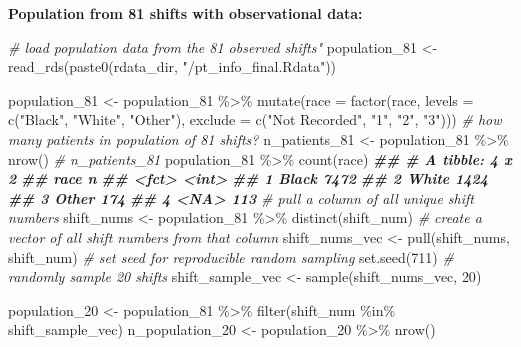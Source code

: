 \documentclass[
]{article}
\newenvironment{Shaded}{\begin{snugshade}}{\end{snugshade}}
\newcommand{\AttributeTok}[1]{\textcolor[rgb]{0.77,0.63,0.00}{#1}}
\newcommand{\CommentTok}[1]{\textcolor[rgb]{0.56,0.35,0.01}{\textit{#1}}}
\newcommand{\DecValTok}[1]{\textcolor[rgb]{0.00,0.00,0.81}{#1}}
\newcommand{\DocumentationTok}[1]{\textcolor[rgb]{0.56,0.35,0.01}{\textbf{\textit{#1}}}}
\newcommand{\FunctionTok}[1]{\textcolor[rgb]{0.00,0.00,0.00}{#1}}
\newcommand{\NormalTok}[1]{#1}
\newcommand{\OtherTok}[1]{\textcolor[rgb]{0.56,0.35,0.01}{#1}}
\newcommand{\SpecialCharTok}[1]{\textcolor[rgb]{0.00,0.00,0.00}{#1}}
\newcommand{\StringTok}[1]{\textcolor[rgb]{0.31,0.60,0.02}{#1}}
\begin{document}
\textbf{Population from 81 shifts with observational data:}

\begin{Shaded}
\begin{Highlighting}[]
\CommentTok{\# load population data from the 81 observed shifts"}
\NormalTok{population\_81 }\OtherTok{\textless{}{-}} \FunctionTok{read\_rds}\NormalTok{(}\FunctionTok{paste0}\NormalTok{(rdata\_dir, }\StringTok{"/pt\_info\_final.Rdata"}\NormalTok{))}

\NormalTok{population\_81 }\OtherTok{\textless{}{-}}\NormalTok{ population\_81 }\SpecialCharTok{\%\textgreater{}\%}
  \FunctionTok{mutate}\NormalTok{(}\AttributeTok{race =} \FunctionTok{factor}\NormalTok{(race,}
              \AttributeTok{levels =} \FunctionTok{c}\NormalTok{(}\StringTok{"Black"}\NormalTok{,}
                         \StringTok{"White"}\NormalTok{,}
                         \StringTok{"Other"}\NormalTok{),}
              \AttributeTok{exclude =} \FunctionTok{c}\NormalTok{(}\StringTok{"Not Recorded"}\NormalTok{, }\StringTok{"1"}\NormalTok{, }\StringTok{"2"}\NormalTok{, }\StringTok{"3"}\NormalTok{)))}
\CommentTok{\# how many patients in population of 81 shifts?}
\NormalTok{n\_patients\_81 }\OtherTok{\textless{}{-}}\NormalTok{ population\_81 }\SpecialCharTok{\%\textgreater{}\%}
  \FunctionTok{nrow}\NormalTok{()}
\CommentTok{\# n\_patients\_81}
\NormalTok{population\_81 }\SpecialCharTok{\%\textgreater{}\%}
  \FunctionTok{count}\NormalTok{(race)}
\DocumentationTok{\#\# \# A tibble: 4 x 2}
\DocumentationTok{\#\#   race      n}
\DocumentationTok{\#\#   \textless{}fct\textgreater{} \textless{}int\textgreater{}}
\DocumentationTok{\#\# 1 Black  7472}
\DocumentationTok{\#\# 2 White  1424}
\DocumentationTok{\#\# 3 Other   174}
\DocumentationTok{\#\# 4 \textless{}NA\textgreater{}    113}
\CommentTok{\# pull a column of all unique shift numbers}
\NormalTok{shift\_nums }\OtherTok{\textless{}{-}}\NormalTok{ population\_81 }\SpecialCharTok{\%\textgreater{}\%}
  \FunctionTok{distinct}\NormalTok{(shift\_num)}
\CommentTok{\# create a vector of all shift numbers from that column}
\NormalTok{shift\_nums\_vec }\OtherTok{\textless{}{-}} \FunctionTok{pull}\NormalTok{(shift\_nums, shift\_num)}
\CommentTok{\# set seed for reproducible random sampling}
\FunctionTok{set.seed}\NormalTok{(}\DecValTok{711}\NormalTok{)}
\CommentTok{\# randomly sample 20 shifts}
\NormalTok{shift\_sample\_vec }\OtherTok{\textless{}{-}} \FunctionTok{sample}\NormalTok{(shift\_nums\_vec, }\DecValTok{20}\NormalTok{)}

\NormalTok{population\_20 }\OtherTok{\textless{}{-}}\NormalTok{ population\_81 }\SpecialCharTok{\%\textgreater{}\%}
  \FunctionTok{filter}\NormalTok{(shift\_num }\SpecialCharTok{\%in\%}\NormalTok{ shift\_sample\_vec) }
\NormalTok{n\_population\_20 }\OtherTok{\textless{}{-}}\NormalTok{ population\_20 }\SpecialCharTok{\%\textgreater{}\%}
  \FunctionTok{nrow}\NormalTok{()}
\end{Highlighting}
\end{Shaded}
\end{document}
